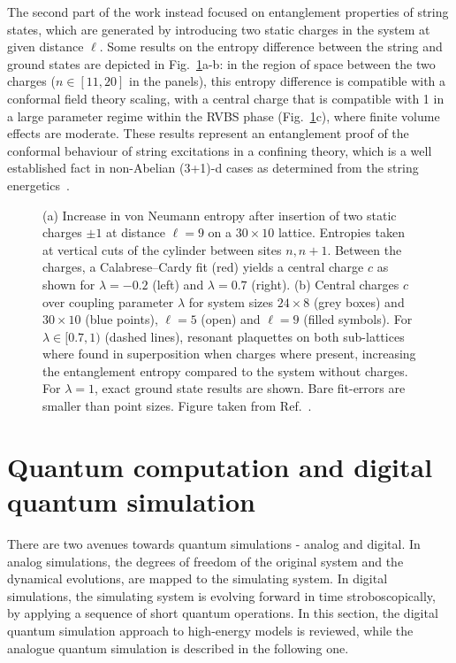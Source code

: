 \documentclass[epj,final]{svjour}
\begin{document}
The second part of the work instead focused on entanglement properties of string states, which are generated by introducing two static charges in the system at given distance $\ell$. Some results on the entropy difference between the string and ground states are depicted in Fig.~\ref{fig:Ent_Ice}a-b: in the region of space between the two charges  ($n\in[11,20]$ in the panels), this entropy difference is compatible with a conformal field theory scaling, with a central charge that is compatible with 1 in a large parameter regime within the RVBS phase (Fig.~\ref{fig:Ent_Ice}c), where finite volume effects are moderate. These results represent an entanglement proof of the conformal behaviour of string excitations in a confining theory, which is a well established fact in non-Abelian (3+1)-d cases as determined from the string energetics~\cite{L_scher_2002}.

\begin{figure}
\caption{(a) Increase in von Neumann entropy after insertion of two static charges $\pm1$ at distance $\ell=9$ on a $30\times10$ lattice. Entropies taken at vertical cuts of the cylinder between sites $n,n+1$. Between the charges, a Calabrese--Cardy fit (red) yields a central charge $c$ as shown for $\lambda=-0.2$ (left) and $\lambda=0.7$ (right). (b) Central charges $c$ over coupling parameter $\lambda$ for system sizes $24\times8$ (grey boxes) and $30\times10$ (blue points), $\ell=5$ (open) and $\ell=9$ (filled symbols). For $\lambda\in\mathopen{[}0.7,1\mathclose{)}$ (dashed lines), resonant plaquettes on both sub-lattices where found in superposition when charges where present, increasing the entanglement entropy compared to the system without charges. For $\lambda=1$, exact ground state results are shown. Bare fit-errors are smaller than point sizes. Figure taken from Ref.~\cite{tschirsich2019phase}. }
\label{fig:Ent_Ice}
\end{figure} 

\section{Quantum computation and digital quantum simulation}
\label{QCDQS}

There are two avenues towards quantum simulations - analog and digital. In analog simulations, the degrees of freedom of the original system and the dynamical evolutions, are mapped to the simulating system. In digital simulations, the simulating system is evolving forward in time stroboscopically, by applying a sequence of short quantum operations. In this section, the digital quantum simulation approach to high-energy models is reviewed, while the analogue quantum simulation is described in the following one. 
\end{document}
